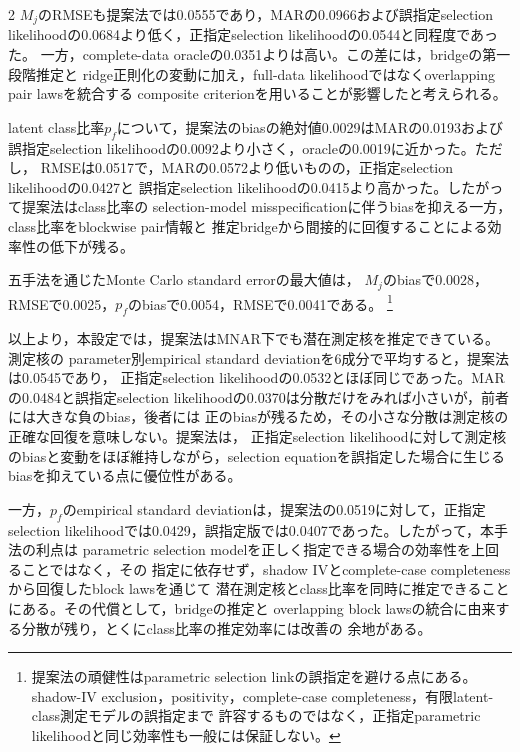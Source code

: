 \documentclass[a4paper,10pt]{article}
\begin{document}
\begin{multicols}{2}
$M_j$のRMSEも提案法では0.0555であり，MARの0.0966および誤指定selection
likelihoodの0.0684より低く，正指定selection likelihoodの0.0544と同程度であった。
一方，complete-data oracleの0.0351よりは高い。この差には，bridgeの第一段階推定と
ridge正則化の変動に加え，full-data likelihoodではなくoverlapping pair lawsを統合する
composite criterionを用いることが影響したと考えられる。

latent class比率$p_f$について，提案法のbiasの絶対値0.0029はMARの0.0193および
誤指定selection likelihoodの0.0092より小さく，oracleの0.0019に近かった。ただし，
RMSEは0.0517で，MARの0.0572より低いものの，正指定selection likelihoodの0.0427と
誤指定selection likelihoodの0.0415より高かった。したがって提案法はclass比率の
selection-model misspecificationに伴うbiasを抑える一方，class比率をblockwise pair情報と
推定bridgeから間接的に回復することによる効率性の低下が残る。

五手法を通じたMonte Carlo standard errorの最大値は，
$M_j$のbiasで0.0028，RMSEで0.0025，$p_f$のbiasで0.0054，RMSEで0.0041である。%
\footnote{提案法の頑健性はparametric selection linkの誤指定を避ける点にある。
shadow-IV exclusion，positivity，complete-case completeness，有限latent-class測定モデルの誤指定まで
許容するものではなく，正指定parametric likelihoodと同じ効率性も一般には保証しない。}

以上より，本設定では，提案法はMNAR下でも潜在測定核を推定できている。測定核の
parameter別empirical standard deviationを6成分で平均すると，提案法は0.0545であり，
正指定selection likelihoodの0.0532とほぼ同じであった。MARの0.0484と誤指定selection
likelihoodの0.0370は分散だけをみれば小さいが，前者には大きな負のbias，後者には
正のbiasが残るため，その小さな分散は測定核の正確な回復を意味しない。提案法は，
正指定selection likelihoodに対して測定核のbiasと変動をほぼ維持しながら，selection
equationを誤指定した場合に生じるbiasを抑えている点に優位性がある。

一方，$p_f$のempirical standard deviationは，提案法の0.0519に対して，正指定selection
likelihoodでは0.0429，誤指定版では0.0407であった。したがって，本手法の利点は
parametric selection modelを正しく指定できる場合の効率性を上回ることではなく，その
指定に依存せず，shadow IVとcomplete-case completenessから回復したblock lawsを通じて
潜在測定核とclass比率を同時に推定できることにある。その代償として，bridgeの推定と
overlapping block lawsの統合に由来する分散が残り，とくにclass比率の推定効率には改善の
余地がある。




\end{multicols}
\end{document}
